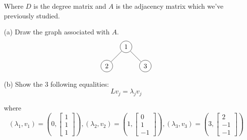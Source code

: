 \documentclass[16 pt]{amsart}
\theoremstyle{definition}
\theoremstyle{remark}
\numberwithin{equation}{subsection}
\begin{document}
Where $D$ is the degree matrix and $A$ is the adjacency matrix which we've previously studied.

(a) Draw the graph associated with $A$.\\
\[
\begin{tikzpicture}
\node[circle, draw](1) at (1,1){1};
\node[circle, draw](2) at (0,0){2};
\node[circle, draw](3) at (2,0){3};
\foreach \from/\to in {1/2,1/3} 
\draw (\from) -- (\to);
\end{tikzpicture}
\]

(b) Show the 3 following equalities:
\[
L v_j = \lambda_j v_j
\]

where
\[
(\lambda_1,v_1) = \left(0, 
\begin{bmatrix}
1 \\ 1\\ 1
\end{bmatrix}\right), 
(\lambda_2,v_2) = \left(1, 
\begin{bmatrix}
0 \\ 1\\-1
\end{bmatrix}\right), 
(\lambda_3,v_3) = \left(3,
\begin{bmatrix}
2 \\ -1 \\ -1
\end{bmatrix}\right)
\]
\end{document}
